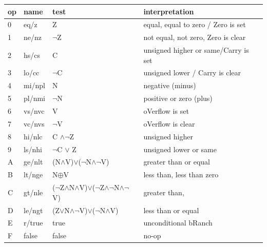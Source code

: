 \documentclass{ol-softwaremanual}
\begin{document}
    {\ttfamily
    \def\not{{$\neg$}}
    \def\tand{{$\wedge$}}
    \def\tor{{$\vee$}}
    \renewcommand{\arraystretch}{1.2}
        \begin{tabularx}{\textwidth}{l l l X}
            op & name   & test                                                      & interpretation                       \\\hline
            0  & eq/z   & Z                                                         & equal, equal to zero / Zero is set   \\
            1  & ne/nz  & \not Z                                                    & not equal, not zero, Zero is clear   \\
            2  & hs/cs  & C                                                         & unsigned higher or same/Carry is set \\
            3  & lo/cc  & \not C                                                    & unsigned lower / Carry is clear      \\
            4  & mi/npl & N                                                         & negative (minus)                     \\
            5  & pl/nmi & \not N                                                    & positive or zero (plus)              \\
            6  & vs/nvc & V                                                         & oVerflow is set                      \\
            7  & vc/nvs & \not V                                                    & oVerflow is clear                    \\
            8  & hi/nlc & C $\wedge \neg$Z                                          & unsigned higher                      \\
            9  & ls/nhi & \not C $\vee$ Z                                           & unsigned lower or same               \\
            A  & ge/nlt & (N\tand V)\tor (\not N\tand\not V)                        & greater than or equal                \\
            B  & lt/nge & N$\oplus$V                                                & less than, less than zero            \\
            C  & gt/nle & (\not Z\tand N\tand V)\tor (\not Z\tand\not N\tand\not V) & greater than,                        \\
            D  & le/ngt & (Z\tor N\tand\not V)\tor (\not N\tand V)                  & less than or equal                   \\
            E  & r/true & true                                                      & unconditional bRanch                 \\
            F  & false  & false                                                     & no-op                                \\

        \end{tabularx}
    }
\end{document}
